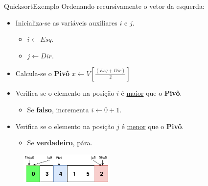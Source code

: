 \documentclass[aspectratio=169]{beamer}
\begin{document}

\begin{frame}{Quicksort}{Exemplo}
Ordenando recursivamente o vetor da esquerda:
\begin{itemize}
\item Inicializa-se as variáveis auxiliares $i$ e $j$.
\begin{itemize}
 \item $i \leftarrow Esq$. 
 \item $j \leftarrow Dir$. 
\end{itemize}
\item Calcula-se o {\bf Pivô} $x\leftarrow V[ \frac{(Esq + Dir)}{2}]$
\item Verifica se o elemento na posição $i$ é \underline{maior} que o {\bf Pivô}.
\begin{itemize}
\item Se {\bf falso}, incrementa $i \leftarrow 0 + 1$.
\end{itemize} 
\item Verifica se o elemento na posição $j$ é \underline{menor} que o {\bf Pivô}.
\begin{itemize}
\item Se {\bf verdadeiro}, pára.
\end{itemize} 
\end{itemize}

\begin{figure}[!h]
  \centering
  \includegraphics[width=130pt]{imgs/quick/quick16.png}
  \label{fig_quick16}
\end{figure}
\end{frame}

\end{document}
